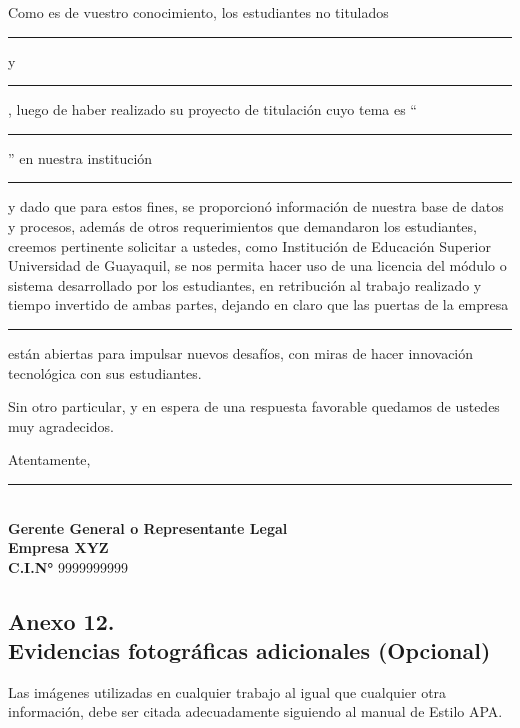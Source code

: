 \documentclass[12pt, a4paper, nofontenc, numbers=endperiod]{apa7}
\begin{document}
{\setlength{\parindent}{1.27cm}Como es de vuestro conocimiento, los estudiantes no titulados \rule[0mm]{60mm}{0.1mm} y  \rule[0mm]{60mm}{0.1mm}, luego de haber realizado su proyecto de titulación cuyo tema es “\rule[0mm]{80mm}{0.1mm}” en nuestra institución \rule[0mm]{60mm}{0.1mm} y dado que para estos fines, se proporcionó información de nuestra base de datos y procesos, además de otros requerimientos que demandaron los estudiantes, creemos pertinente solicitar a ustedes, como Institución de Educación Superior Universidad de Guayaquil, se nos permita hacer uso de una licencia del módulo o sistema desarrollado por los estudiantes, en retribución al trabajo realizado y tiempo invertido de ambas partes, dejando en claro que las puertas de la empresa \rule[0mm]{60mm}{0.1mm}  están abiertas para impulsar nuevos desafíos, con miras de hacer innovación tecnológica con sus estudiantes.

\setlength{\parindent}{1.27cm}Sin otro particular, y en espera de una respuesta favorable quedamos de ustedes muy agradecidos.

\setlength{\parindent}{0cm}Atentamente,
\begin{center}
	\singlespacing
	\rule[0mm]{80mm}{0.1mm} \\
	\textbf{Gerente General o Representante Legal}\\
	\textbf{Empresa XYZ}\\
	\textbf{C.I.N°} 9999999999
\end{center}



\newpage
\subsection*{\normalsize \centering Anexo 12. \\ Evidencias fotográficas adicionales (Opcional)}

\setlength{\parindent}{0cm}Las imágenes utilizadas en cualquier trabajo al igual que cualquier otra información, debe ser citada adecuadamente siguiendo al manual de Estilo APA.

}
\end{document}
